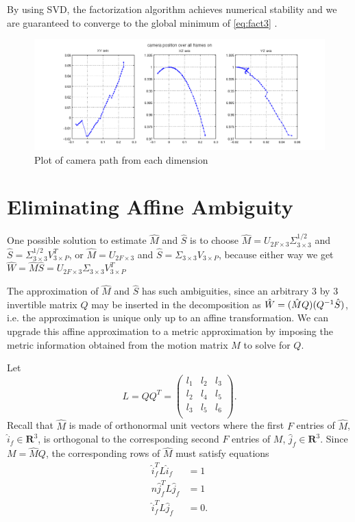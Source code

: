 By using SVD, the factorization algorithm achieves numerical stability
and we are guaranteed to converge to the global minimum of
\eqref{eq:fact3} \cite{Morris}. 
\begin{figure}[!ht]
  \begin{center}
  \includegraphics[scale=0.4]{camerapath.png}
  \caption{Plot of camera path from each dimension} 
  \label{fig:path}
  \end{center}
\end{figure}

\section{Eliminating Affine Ambiguity}

One possible solution to estimate $\hat M$ and $\hat S$ is to choose
$\hat M = U_{2F\times 3}\Sigma_{3 \times 3}^{1/2}$ and $\hat S =\Sigma_{3 \times 3}^{1/2}V_{3\times P}^T$, or
$\hat M =U_{2F\times 3}$ and $\hat S=\Sigma_{3 \times 3}V_{3\times
  P}$, because either way we get $\hat W = \hat M \hat S = U_{2F\times 3}\Sigma_{3 \times 3} V_{3\times P}^T$

The approximation of $\hat M$ and $\hat S$ has such ambiguities, since
an arbitrary 3 by 3 invertible matrix $Q$ may be inserted in the
decomposition as $\hat W = (\hat M Q) (Q^{-1} \hat S)$, i.e. the
approximation is unique only up to an affine transformation. We can
upgrade this affine approximation to a metric approximation by
imposing the metric information obtained from the motion matrix $M$ to
solve for $Q$.

Let $$L = QQ^T =
\begin{pmatrix}
l_1& l_2& l_3\\
l_2& l_4& l_5\\
l_3& l_5& l_6\\
\end{pmatrix}.
$$ Recall that $\hat M$ is made of orthonormal unit vectors where the first
$F$ entries of $\hat M$, $\hat i_f\in \mathbf{R}^3$, is orthogonal to the corresponding second $F$
entries of $M$, $\hat j_f \in \mathbf{R}^3$. Since $M = \hat M Q$, the corresponding
rows of $\hat M$ must satisfy equations 
\begin{align*}
  \label{eq:metric}  
  \hat i_f^T L \hat i_f &= 1\\
n  \hat j_f^T L \hat j_f &= 1\\
  \hat i_f^T L \hat j_f &= 0.\\
\end{align*}

